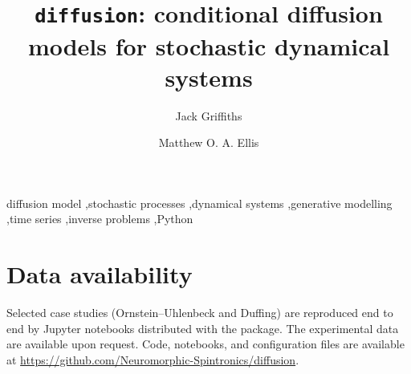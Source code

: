 \documentclass[preprint,12pt]{elsarticle}
\begin{document}
\begin{frontmatter}

\title{\texttt{diffusion}: conditional diffusion models for stochastic dynamical systems}

\author[a]{Jack Griffiths}
\address[a]{School of Computer Science, Sheffield University, United Kingdom}

\author[b]{Matthew O. A. Ellis}
\address[b]{School of Computer Science, Sheffield University, United Kingdom}

\begin{abstract}

\end{abstract}

\begin{keyword}
diffusion model \sep stochastic processes \sep dynamical systems \sep generative
modelling \sep time series \sep inverse problems \sep Python
\end{keyword}

\end{frontmatter}






\section*{Data availability}
Selected case studies (Ornstein--Uhlenbeck and Duffing) are reproduced end to end
by Jupyter notebooks distributed with the package. The experimental data are
available upon request. Code, notebooks, and configuration files are available at
\url{https://github.com/Neuromorphic-Spintronics/diffusion}.



\end{document}
